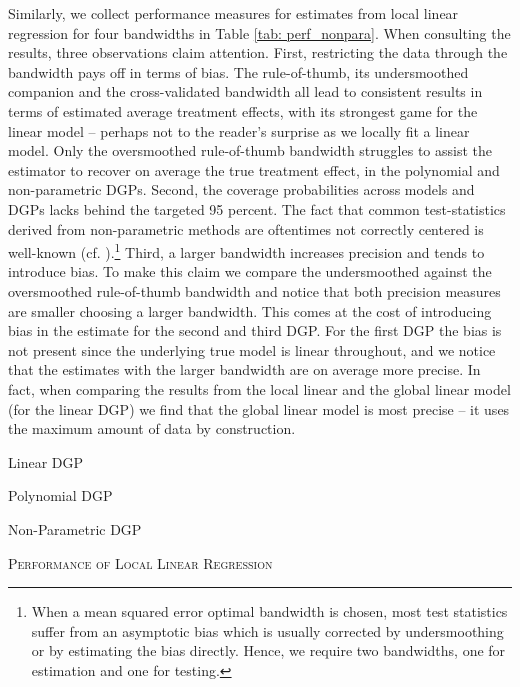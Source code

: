 Similarly, we collect performance measures for estimates from local linear regression for four bandwidths in Table \ref{tab: perf_nonpara}. When consulting the results, three observations claim attention. First, restricting the data through the bandwidth pays off in terms of bias. The rule-of-thumb, its undersmoothed companion and the cross-validated bandwidth all lead to consistent results in terms of estimated average treatment effects, with its strongest game for the linear model -- perhaps not to the reader's surprise as we locally fit a linear model. Only the oversmoothed rule-of-thumb bandwidth struggles to assist the estimator to recover on average the true treatment effect, in the polynomial and non-parametric DGPs. Second, the coverage probabilities across models and DGPs lacks behind the targeted 95 percent. The fact that common test-statistics derived from non-parametric methods are oftentimes not correctly centered is well-known (cf. \cite{wasserman}).\footnote{When a mean squared error optimal bandwidth is chosen, most test statistics suffer from an asymptotic bias which is usually corrected by undersmoothing or by estimating the bias directly. Hence, we require two bandwidths, one for estimation and one for testing.} Third, a larger bandwidth increases precision and tends to introduce bias. To make this claim we compare the undersmoothed against the oversmoothed rule-of-thumb bandwidth and notice that both precision measures are smaller choosing a larger bandwidth. This comes at the cost of introducing bias in the estimate for the second and third DGP. For the first DGP the bias is not present since the underlying true model is linear throughout, and we notice that the estimates with the larger bandwidth are on average more precise. In fact, when comparing the results from the local linear and the global linear model (for the linear DGP) we find that the global linear model is most precise -- it uses the maximum amount of data by construction.

\begin{table}[H]
	\begin{subtable}{\textwidth}
		\centering
		
		\caption{Linear DGP}
		\label{tab: llr_linear}
		\hspace{\fill}
	\end{subtable}
	\begin{subtable}{\textwidth}
		\centering
		
		\caption{Polynomial DGP}
		\label{tab: llr_poly}
		\hspace{\fill}
	\end{subtable}
	\begin{subtable}{\textwidth}
		\centering
		
		\caption{Non-Parametric DGP}
		\label{tab: llr_nonparam}
	\end{subtable}
	\caption{\textsc{Performance of Local Linear Regression}}
	\label{tab: perf_nonpara}
\end{table}

